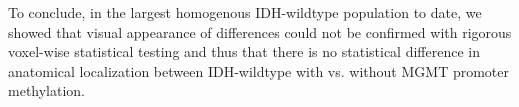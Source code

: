 To conclude, in the largest homogenous \gls{IDH}-wildtype  population to date, we showed that visual appearance of differences could not be confirmed with rigorous voxel-wise statistical testing and thus that there is no statistical difference in anatomical localization between \gls{IDH}-wildtype  with vs. without \gls{MGMT} promoter methylation.





